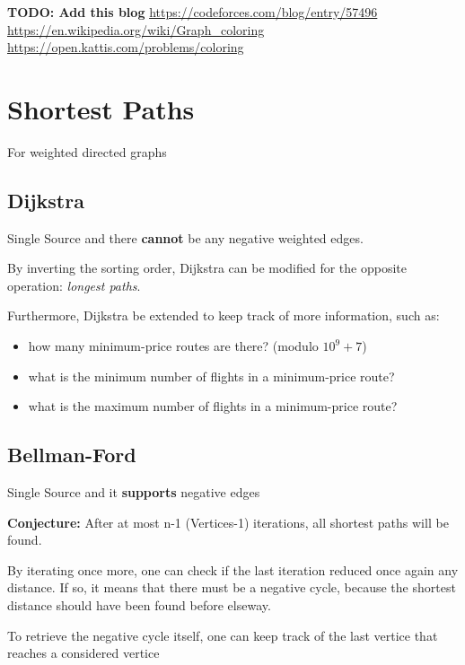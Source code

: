 		\textbf{TODO: Add this blog}
		\url{https://codeforces.com/blog/entry/57496}
		\url{https://en.wikipedia.org/wiki/Graph_coloring}
		\url{https://open.kattis.com/problems/coloring}

\section{Shortest Paths}

	For weighted directed graphs

	\subsection{Dijkstra}

		Single Source and there \textbf{cannot} be any negative weighted edges. 


		By inverting the sorting order, Dijkstra can be modified for the opposite operation: \textit{longest paths}.

		Furthermore, Dijkstra be extended to keep track of more information, such as:

		\begin{itemize}
			\item how many minimum-price routes are there? (modulo $10^9+7$)
			\item what is the minimum number of flights in a minimum-price route?
			\item what is the maximum number of flights in a minimum-price route?
		\end{itemize}


	\subsection{Bellman-Ford}

		Single Source and it \textbf{supports} negative edges

		\textbf{Conjecture:} After at most n-1 (Vertices-1) iterations, all shortest paths will be found.
		

		By iterating once more, one can check if the last iteration reduced once again any distance. If so, it means that
		there must be a negative cycle, because the shortest distance should have been found before elseway.
		
		To retrieve the negative cycle itself, one can keep track of the last vertice that reaches a considered vertice

